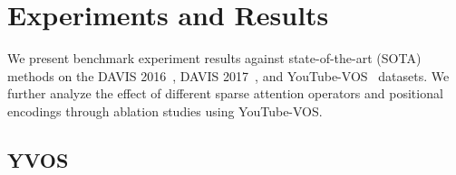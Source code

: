 \section{Experiments and Results}
\label{sec:experiments}

We present benchmark experiment results against state-of-the-art (SOTA) methods
on the DAVIS 2016~\cite{perazzi2016abenchmark}, DAVIS
2017~\cite{ponttuset2017davis}, and YouTube-VOS~\cite{xu2018youtubevos}
datasets.
We further analyze the effect of different sparse attention operators and
positional encodings through ablation studies using YouTube-VOS\@.


\subsection{YVOS}


